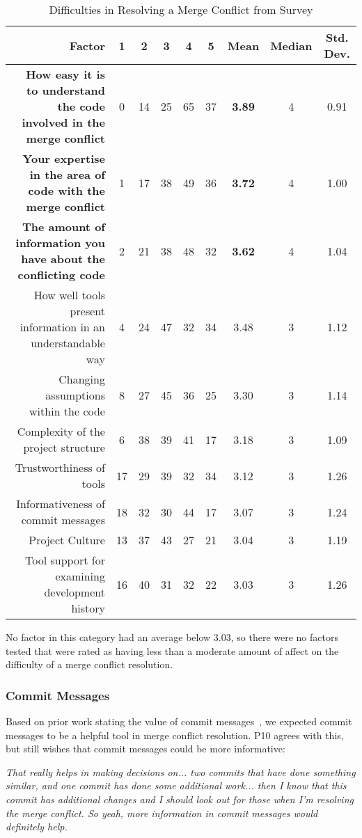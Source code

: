 \begin{table*}[!]
\renewcommand{\arraystretch}{1.3}
\caption{Difficulties in Resolving a Merge Conflict from Survey}
\label{survey_res_diffs}
\centering
\begin{tabularx}{0.9\textwidth}{r | *5{c} | *3{c}}

\toprule
	Factor & 1 & 2 & 3 & 4 & 5 & Mean & Median & Std. Dev. \\
\midrule
	\textbf{How easy it is to understand the code involved in the merge conflict} & 0 & 14 & 25 & 65 & 37 & \textbf{3.89} & 4 & 0.91\\
	\textbf{Your expertise in the area of code with the merge conflict} & 1 & 17 & 38 & 49 & 36 & \textbf{3.72} & 4 & 1.00\\
	\textbf{The amount of information you have about the conflicting code} & 2 & 21 & 38 & 48 & 32 & \textbf{3.62} & 4 & 1.04\\
	How well tools present information in an understandable way & 4 & 24 & 47 & 32 & 34 & 3.48 & 3 & 1.12\\
	Changing assumptions within the code & 8 & 27 & 45 & 36 & 25 & 3.30 & 3 & 1.14\\
	Complexity of the project structure & 6 & 38 & 39 & 41 & 17 & 3.18 & 3 & 1.09\\
	Trustworthiness of tools & 17 & 29 & 39 & 32 & 34 & 3.12 & 3 & 1.26\\
	Informativeness of commit messages & 18 & 32 & 30 & 44 & 17 & 3.07 & 3 & 1.24\\
	Project Culture & 13 & 37 & 43 & 27 & 21 & 3.04 & 3 & 1.19\\
	Tool support for examining development history & 16 & 40 & 31 & 32 & 22 & 3.03 & 3 & 1.26\\
\bottomrule
\end{tabularx}
\end{table*}

No factor in this category had an average below 3.03, so there were no factors tested that were rated as having less than a moderate amount of affect on the difficulty of a merge conflict resolution.

\subsubsection{Commit Messages}
Based on prior work stating the value of commit messages~\cite{yamauchi2014clustering}\cite{hindle2009automatic}\cite{cortes2014automatically}\cite{hattori2008nature}, we expected commit messages to be a helpful tool in merge conflict resolution. 
P10 agrees with this, but still wishes that commit messages could be more informative:
\begin{displayquote}
	\textit{That really helps in making decisions on... two commits that have done something similar, and one commit has done some additional work... then I know that this commit has additional changes and I should look out for those when I'm resolving the merge conflict. So yeah, more information in commit messages would definitely help.}
\end{displayquote}

